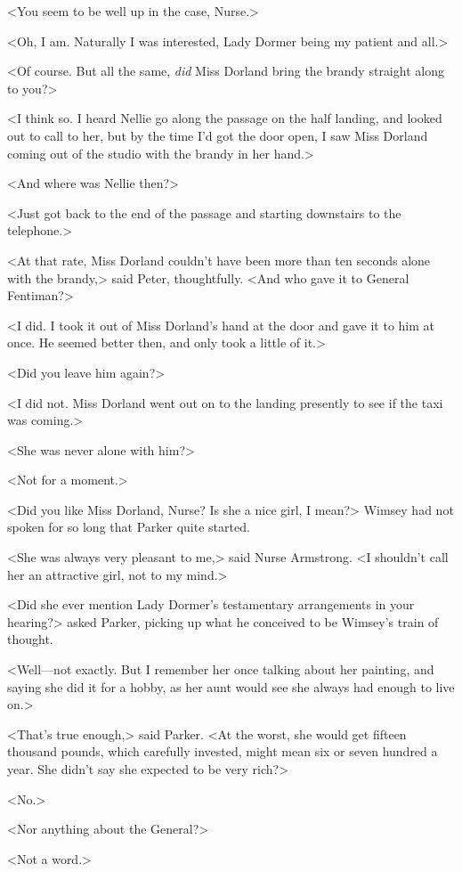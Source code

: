 <You seem to be well up in the case, Nurse.>

<Oh, I am. Naturally I was interested, Lady Dormer being my patient and all.>

<Of course. But all the same, \emph{did} Miss Dorland bring the brandy straight along to you?>

<I think so. I heard Nellie go along the passage on the half landing, and looked out to call to her, but by the time I'd got the door open, I saw Miss Dorland coming out of the studio with the brandy in her hand.>

<And where was Nellie then?>

<Just got back to the end of the passage and starting downstairs to the telephone.>

<At that rate, Miss Dorland couldn't have been more than ten seconds alone with the brandy,> said Peter, thoughtfully. <And who gave it to General Fentiman?>

<I did. I took it out of Miss Dorland's hand at the door and gave it to him at once. He seemed better then, and only took a little of it.>

<Did you leave him again?>

<I did not. Miss Dorland went out on to the landing presently to see if the taxi was coming.>

<She was never alone with him?>

<Not for a moment.>

<Did you like Miss Dorland, Nurse? Is she a nice girl, I mean?> Wimsey had not spoken for so long that Parker quite started.

<She was always very pleasant to me,> said Nurse Armstrong. <I shouldn't call her an attractive girl, not to my mind.>

<Did she ever mention Lady Dormer's testamentary arrangements in your hearing?> asked Parker, picking up what he conceived to be Wimsey's train of thought.

<Well—not exactly. But I remember her once talking about her painting, and saying she did it for a hobby, as her aunt would see she always had enough to live on.>

<That's true enough,> said Parker. <At the worst, she would get fifteen thousand pounds, which carefully invested, might mean six or seven hundred a year. She didn't say she expected to be very rich?>

<No.>

<Nor anything about the General?>

<Not a word.>


